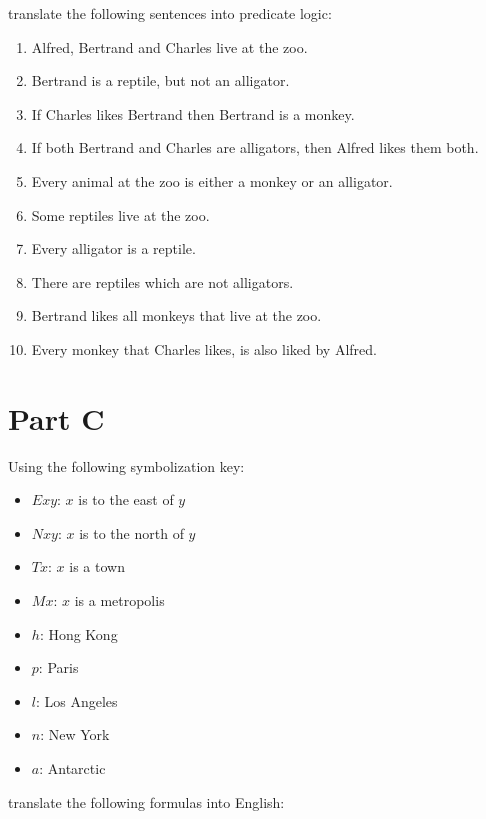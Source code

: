 \documentclass[
]{book}
\providecommand{\tightlist}{%
  \setlength{\itemsep}{0pt}\setlength{\parskip}{0pt}}
\begin{document}
translate the following sentences into predicate logic:

\begin{enumerate}
\def\labelenumi{\arabic{enumi}.}
\tightlist
\item
  Alfred, Bertrand and Charles live at the zoo.
\item
  Bertrand is a reptile, but not an alligator.
\item
  If Charles likes Bertrand then Bertrand is a monkey.
\item
  If both Bertrand and Charles are alligators, then Alfred likes them both.
\item
  Every animal at the zoo is either a monkey or an alligator.
\item
  Some reptiles live at the zoo.
\item
  Every alligator is a reptile.
\item
  There are reptiles which are not alligators.
\item
  Bertrand likes all monkeys that live at the zoo.
\item
  Every monkey that Charles likes, is also liked by Alfred.
\end{enumerate}

\hypertarget{part-c}{%
\section{Part C}\label{part-c}}

Using the following symbolization key:

\begin{itemize}
\tightlist
\item
  \(Exy\): \(x\) is to the east of \(y\)
\item
  \(Nxy\): \(x\) is to the north of \(y\)
\item
  \(Tx\): \(x\) is a town
\item
  \(Mx\): \(x\) is a metropolis
\item
  \(h\): Hong Kong
\item
  \(p\): Paris
\item
  \(l\): Los Angeles
\item
  \(n\): New York
\item
  \(a\): Antarctic
\end{itemize}

translate the following formulas into English:
\end{document}
